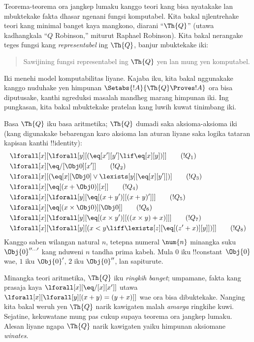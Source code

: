 \documentclass[../../../include/open-logic-section]{subfiles}
\begin{document}

Teorema-teorema ora jangkep lumaku kanggo teori kang bisa
nyatakake lan mbuktekake fakta dhasar ngenani fungsi komputabel.
Kita bakal njlentrehake teori kang minimal banget kaya mangkono,
diarani ``$\Th{Q}$'' (utawa kadhangkala ``$Q$ Robinson,''
miturut Raphael Robinson). Kita bakal nerangake teges fungsi
kang \emph{representabel} ing $\Th{Q}$, banjur mbuktekake iki:
\begin{quote}
  Sawijining fungsi representabel ing $\Th{Q}$ yen lan mung yen komputabel.
\end{quote}
Iki menehi model komputabilitas liyane. Kajaba iku, kita bakal
nggunakake kanggo nuduhake yen himpunan
$\Setabs{!A}{\Th{Q} \Proves !A}$ ora bisa diputusake, kanthi
ngreduksi masalah mandheg marang himpunan iki. Ing pungkasan,
kita bakal mbuktekake pratelan kang luwih kuwat tinimbang iki.

Basa $\Th{Q}$ iku basa aritmetika; $\Th{Q}$ dumadi saka
aksioma-aksioma iki (kang digunakake bebarengan karo aksioma
lan aturan liyane saka logika tataran kapisan kanthi !!{identity}):
\begin{align*}
& \lforall[x][\lforall[y][(\eq[x'][y'] \lif \eq[x][y])]] \tag{$!Q_1$}\\
& \lforall[x][\eq/[\Obj 0][x']] \tag{$!Q_2$}\\
& \lforall[x][(\eq[x][\Obj 0] \lor \lexists[y][\eq[x][y']])] \tag{$!Q_3$}\\
& \lforall[x][\eq[(x + \Obj 0)][x]] \tag{$!Q_4$}\\
& \lforall[x][\lforall[y][\eq[(x + y')][(x + y)']]] \tag{$!Q_5$}\\
& \lforall[x][\eq[(x \times \Obj 0)][\Obj 0]] \tag{$!Q_6$}\\
& \lforall[x][\lforall[y][\eq[(x \times y')][((x \times y) + x)]]] \tag{$!Q_7$}\\
& \lforall[x][\lforall[y][(x < y \liff \lexists[z][\eq[(z' + x)][y]])]] \tag{$!Q_8$}
\end{align*}
Kanggo saben wilangan natural $n$, tetepna numeral $\num{n}$ minangka
suku $\Obj{0}^{\prime\prime\ldots\prime}$ kang nduweni $n$
tandha prima kabeh. Mula $\num{0}$ iku !!{constant}~$\Obj{0}$
wae, $\num{1}$ iku $\Obj{0}'$, $\num{2}$ iku $\Obj{0}''$,
lan sapiturute.

Minangka teori aritmetika, $\Th{Q}$ iku \emph{ringkih banget};
umpamane, fakta kang prasaja kaya
$\lforall[x][\eq/[x][x']]$ utawa $\lforall[x][\lforall[y][(x + y) = (y +
    x)]]$ wae ora bisa dibuktekake. Nanging kita bakal weruh yen
$\Th{Q}$ narik kawigaten malah \emph{amarga} ringkihe kuwi.
Sejatine, kekuwatane mung pas cukup supaya teorema ora jangkep
lumaku. Alesan liyane ngapa $\Th{Q}$ narik kawigaten yaiku
himpunan aksiomane \emph{winates}.
\end{document}
